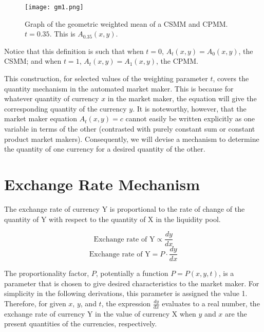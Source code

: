 \documentclass{article}
\begin{document}
\begin{figure}[htp]
    \centering
    \texttt{[image: gm1.png]}
    \caption{Graph of the geometric weighted mean of a CSMM and CPMM. $t=0.35$. This is $A_{0.35}(x,y)$.}
    \label{fig:GM1}
\end{figure}

\noindent Notice that this definition is such that when $t=0$, $A_t(x,y)=A_0(x,y)$, the CSMM; and when $t=1$, $A_t(x,y)=A_1(x,y)$, the CPMM.

\vspace{10}
\noindent This construction, for selected values of the weighting parameter ${t}$, covers the quantity mechanism in the automated market maker. This is because for whatever quantity of currency ${x}$ in the market maker, the equation will give the corresponding quantity of the currency ${y}$.
It is noteworthy, however, that the market maker equation $A_t(x,y) = c$ cannot easily be written explicitly as one variable in terms of the other (contrasted with purely constant sum or constant product market makers). Consequently, we will devise a mechanism to determine the quantity of one currency for a desired quantity of the other.


\section{Exchange Rate Mechanism}
The exchange rate of currency Y is proportional to the rate of change of the quantity of Y with respect to the quantity of X in the liquidity pool. 

$$ \text{Exchange rate of Y} \propto \frac{dy}{dx} $$
$$ \text{Exchange rate of Y} = P \cdot \frac{dy}{dx} $$

\noindent The proportionality factor, $P$, potentially a function $P=P(x,y,t)$, is a parameter that is chosen to give desired characteristics to the market maker. For simplicity in the following derivations, this parameter is assigned the value 1. Therefore, for given $x$, $y$, and $t$, the expression $\frac{dy}{dx}$ evaluates to a real number, the exchange rate of currency Y in the value of currency X when $y$ and $x$ are the present quantities of the currencies, respectively.
\end{document}
